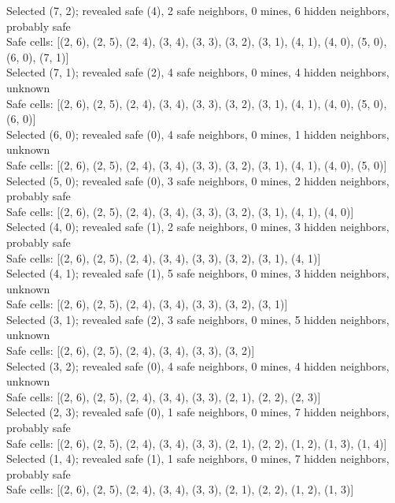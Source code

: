 \documentclass[11pt]{article} %
\begin{document}
Selected (7, 2); revealed safe (4), 2 safe neighbors, 0 mines, 6 hidden neighbors, probably safe\\
Safe cells: [(2, 6), (2, 5), (2, 4), (3, 4), (3, 3), (3, 2), (3, 1), (4, 1), (4, 0), (5, 0), (6, 0), (7, 1)]\\
Selected (7, 1); revealed safe (2), 4 safe neighbors, 0 mines, 4 hidden neighbors, unknown\\
Safe cells: [(2, 6), (2, 5), (2, 4), (3, 4), (3, 3), (3, 2), (3, 1), (4, 1), (4, 0), (5, 0), (6, 0)]\\
Selected (6, 0); revealed safe (0), 4 safe neighbors, 0 mines, 1 hidden neighbors, unknown\\
Safe cells: [(2, 6), (2, 5), (2, 4), (3, 4), (3, 3), (3, 2), (3, 1), (4, 1), (4, 0), (5, 0)]\\
Selected (5, 0); revealed safe (0), 3 safe neighbors, 0 mines, 2 hidden neighbors, probably safe\\
Safe cells: [(2, 6), (2, 5), (2, 4), (3, 4), (3, 3), (3, 2), (3, 1), (4, 1), (4, 0)]\\
Selected (4, 0); revealed safe (1), 2 safe neighbors, 0 mines, 3 hidden neighbors, probably safe\\
Safe cells: [(2, 6), (2, 5), (2, 4), (3, 4), (3, 3), (3, 2), (3, 1), (4, 1)]\\
Selected (4, 1); revealed safe (1), 5 safe neighbors, 0 mines, 3 hidden neighbors, unknown\\
Safe cells: [(2, 6), (2, 5), (2, 4), (3, 4), (3, 3), (3, 2), (3, 1)]\\
Selected (3, 1); revealed safe (2), 3 safe neighbors, 0 mines, 5 hidden neighbors, unknown\\
Safe cells: [(2, 6), (2, 5), (2, 4), (3, 4), (3, 3), (3, 2)]\\
Selected (3, 2); revealed safe (0), 4 safe neighbors, 0 mines, 4 hidden neighbors, unknown\\
Safe cells: [(2, 6), (2, 5), (2, 4), (3, 4), (3, 3), (2, 1), (2, 2), (2, 3)]\\
Selected (2, 3); revealed safe (0), 1 safe neighbors, 0 mines, 7 hidden neighbors, probably safe\\
Safe cells: [(2, 6), (2, 5), (2, 4), (3, 4), (3, 3), (2, 1), (2, 2), (1, 2), (1, 3), (1, 4)]\\
Selected (1, 4); revealed safe (1), 1 safe neighbors, 0 mines, 7 hidden neighbors, probably safe\\
Safe cells: [(2, 6), (2, 5), (2, 4), (3, 4), (3, 3), (2, 1), (2, 2), (1, 2), (1, 3)]\\
\end{document}
